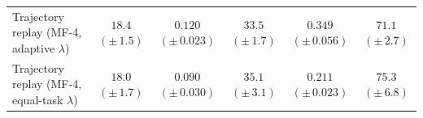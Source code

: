\begin{table}[t]
{\begin{tabular}{@{}lccccc@{}}
\rowcolor{trajectoryrow} Trajectory replay (MF-4, adaptive $\lambda$) & $18.4$ {\scriptsize $(\pm\,1.5)$} & $0.120$ {\scriptsize $(\pm\,0.023)$} & $33.5$ {\scriptsize $(\pm\,1.7)$} & $0.349$ {\scriptsize $(\pm\,0.056)$} & $71.1$ {\scriptsize $(\pm\,2.7)$} \\
\rowcolor{trajectoryrow} Trajectory replay (MF-4, equal-task $\lambda$) & $\mathbf{18.0}$ {\scriptsize $(\pm\,1.7)$} & $0.090$ {\scriptsize $(\pm\,0.030)$} & $35.1$ {\scriptsize $(\pm\,3.1)$} & $\mathbf{0.211}$ {\scriptsize $(\pm\,0.023)$} & $75.3$ {\scriptsize $(\pm\,6.8)$} \\
\bottomrule
\end{tabular}%
}
\end{table}

